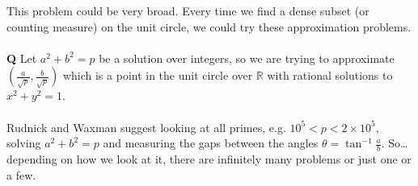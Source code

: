 \documentclass[12pt]{article}
\begin{document}
This problem could be very broad.  Every time we find a dense subset (or counting measure) on the unit circle, we could try these approximation problems. \\ \\
\textbf{Q} Let $a^2 + b^2 = p$ be a solution over integers, so we are trying to approximate $(\frac{a}{\sqrt{p}}, \frac{b}{\sqrt{p}})$ which is a point in the unit circle over $\mathbb{R}$ with rational solutions to $x^2 + y^2 = 1$.  \\ \\
Rudnick and Waxman suggest looking at all primes, e.g. $10^5 < p < 2 \times 10^5$, solving $a^2 + b^2 = p$ and measuring the gaps between the angles $\theta = \tan^{-1} \frac{a}{b}$.  So\dots depending on how we look at it, there are infinitely many problems or just one or a few. 
\end{document}
